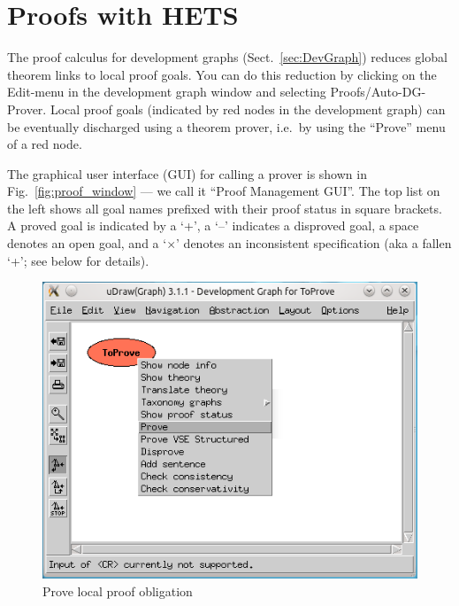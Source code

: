 \documentclass{article}
\newcommand{\normalTEXTSC}[2]{{#1\scriptsize#2}}
\newcommand     {\Hets}{\normalTEXTSC{H}{ETS}\xspace}
\begin{document}
\section{Proofs with \Hets}\label{sec:Proofs}

The proof calculus for development graphs (Sect.~\ref{sec:DevGraph}) reduces
global theorem links to local proof goals. You can do this reduction by clicking 
on the Edit-menu in the development graph window and selecting 
Proofs/Auto-DG-Prover. Local proof goals (indicated by red
nodes in the development graph) can be eventually discharged using a theorem
prover, i.e.\ by using the ``Prove'' menu of a red node.

The graphical user interface (GUI) for calling a prover is shown in
Fig.~\ref{fig:proof_window} --- we call it ``Proof Management GUI''.
The top list on the left shows all goal names prefixed with their proof
status in square brackets. A proved goal is indicated by a `+', a `–'
indicates a disproved goal, a space denotes an open goal, and a
`$\times$' denotes an inconsistent specification (aka a fallen `+';
see below for details).

\begin{figure}[ht]
  \centering
  \includegraphics[width=0.5\linewidth,keepaspectratio=true]{UserGuideCL_Prove_devGraph}
  \caption{Prove local proof obligation\label{fig:Prove_devGraph}}
\end{figure}
\end{document}
